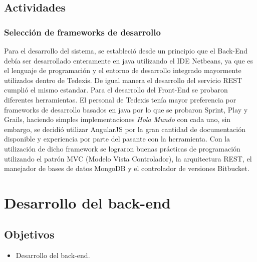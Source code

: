 \subsection{Actividades}

\subsubsection{Selección de frameworks de desarrollo}
\indent Para el desarrollo del sistema, se estableció desde un principio que el Back-End debía ser desarrollado enteramente en java utilizando el IDE Netbeans, ya que es el lenguaje de programación y el entorno de desarrollo integrado mayormente utilizados dentro de Tedexis. De igual manera el desarrollo del servicio REST cumplió el mismo estandar.
\newline
\newline
\indent Para el desarrollo del Front-End se probaron diferentes herramientas. El personal de Tedexis tenía mayor preferencia por frameworks de desarrollo basados en java por lo que se probaron Sprint, Play y Grails, haciendo simples implementaciones \textit{Hola Mundo} con cada uno, sin embargo, se decidió utilizar AngularJS por la gran cantidad de documentación disponible y experiencia por parte del pasante con la herramienta. Con la utilización de dicho framework se lograron buenas prácticas de programación utilizando el patrón MVC (Modelo Vista Controlador), la arquitectura REST, el manejador de bases de datos MongoDB y el controlador de versiones Bitbucket.  


\section{Desarrollo del back-end} \label{sect:Desarrollo del back-end}

\subsection{Objetivos}
\begin{itemize}[noitemsep,nolistsep]
\item Desarrollo del back-end. 
\end{itemize}

